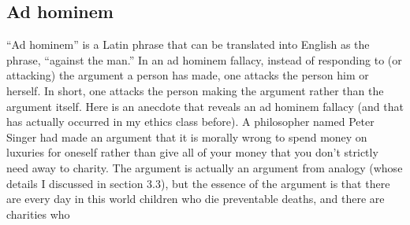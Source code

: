 \subsection{Ad hominem}

``Ad hominem'' is a Latin phrase that can be translated into English as the phrase, ``against the man.'' In an ad hominem fallacy, instead of responding to (or attacking) the argument a person has made, one attacks the person him or herself. In short, one attacks the person making the argument rather than the argument itself. Here is an anecdote that reveals an ad hominem fallacy (and that has actually occurred in my ethics class before). A philosopher named Peter Singer had made an argument that it is
morally wrong to spend money on luxuries for oneself rather than give all
of your money that you don't strictly need away to charity. The argument
is actually an argument from analogy (whose details I discussed in section
3.3), but the essence of the argument is that there are every day in this
world children who die preventable deaths, and there are charities who

